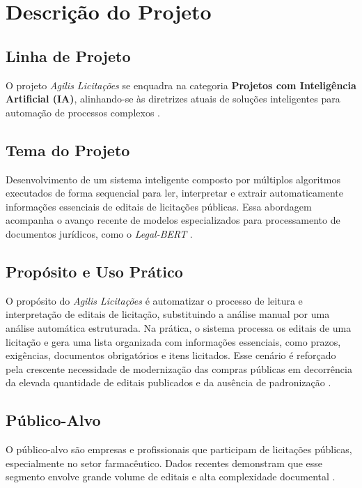 \chapter{Descrição do Projeto}

\section{Linha de Projeto}

O projeto \textit{Agilis Licitações} se enquadra na categoria \textbf{Projetos com Inteligência Artificial (IA)}, alinhando-se às diretrizes atuais de soluções inteligentes para automação de processos complexos \cite{russell_norvig_2020}.

\section{Tema do Projeto}

Desenvolvimento de um sistema inteligente composto por múltiplos algoritmos executados de forma sequencial para ler, interpretar e extrair automaticamente informações essenciais de editais de licitações públicas. Essa abordagem acompanha o avanço recente de modelos especializados para processamento de documentos jurídicos, como o \textit{Legal-BERT} \cite{chalkidis_legalbert_2020}.


\section{Propósito e Uso Prático}

O propósito do \textit{Agilis Licitações} é automatizar o processo de leitura e interpretação de editais de licitação, substituindo a análise manual por uma análise automática estruturada. Na prática, o sistema processa os editais de uma licitação e gera uma lista organizada com informações essenciais, como prazos, exigências, documentos obrigatórios e itens licitados. Esse cenário é reforçado pela crescente necessidade de modernização das compras públicas em decorrência da elevada quantidade de editais publicados e da ausência de padronização \cite{tcu_relatorio_2022, brasil_lei_14133_2021}.

\section{Público-Alvo}

O público-alvo são empresas e profissionais que participam de licitações públicas, especialmente no setor farmacêutico. Dados recentes demonstram que esse segmento envolve grande volume de editais e alta complexidade documental \cite{pncp_estatisticas_2024}.



